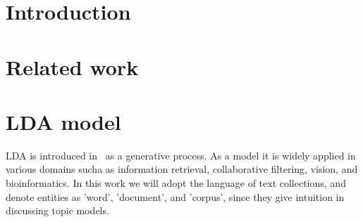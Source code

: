 \documentclass{article}
\begin{document}
\begin{abstract}



\end{abstract}

\section{Introduction} \label{sec:intro}


\section{Related work}

\section{LDA model} \label{sec:ldamodel}
LDA is introduced in~\cite{Blei2003a} as a generative process. As a model it is widely applied in various domains sucha as information retrieval, collaborative filtering, vision, and bioinformatics. In this work we will adopt the language of text collections, and denote entities as 'word', 'document', and 'corpus', since they give intuition in discussing topic models.  
\end{document}
